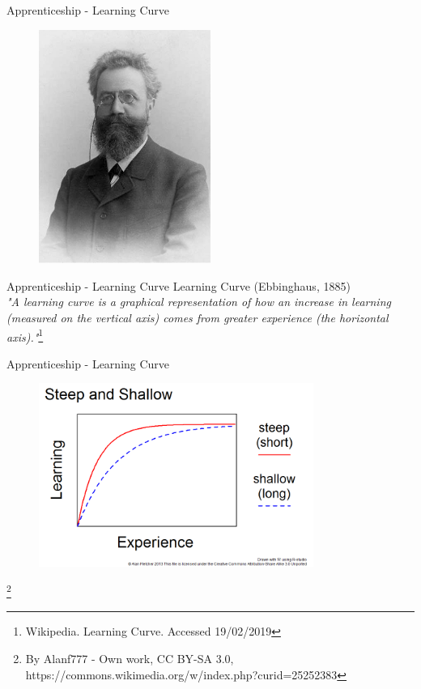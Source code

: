\documentclass{beamer}
\newcommand\blfootnote[1]{%
  \begingroup
  \renewcommand\thefootnote{}\footnote{#1}%
  \addtocounter{footnote}{-1}%
  \endgroup
}
\begin{document}
\begin{frame}{Apprenticeship - Learning Curve}
    \begin{figure}[h]
        \includegraphics[width=0.5\textwidth]{Ebbinghaus2.jpg}
    \end{figure}
\end{frame}

\begin{frame}{Apprenticeship - Learning Curve}
    Learning Curve (Ebbinghaus, 1885)\\
    \vspace{5mm}
    \textit{"A learning curve is a graphical representation of how an increase in learning (measured on the vertical axis) comes from greater experience (the horizontal axis)."}\footnote{Wikipedia. Learning Curve. Accessed 19/02/2019}
\end{frame}

\begin{frame}{Apprenticeship - Learning Curve}
    \begin{figure}[h]
        \includegraphics[width=0.8\textwidth]{steepshallow.png}
    \end{figure}\blfootnote{By Alanf777 - Own work, CC BY-SA 3.0, https://commons.wikimedia.org/w/index.php?curid=25252383}
\end{frame}
\end{document}
